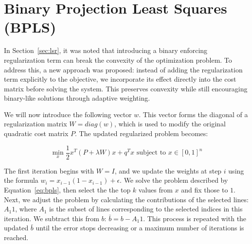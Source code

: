 \section{Binary Projection Least Squares (BPLS)}

In Section~\ref{sec:lsr}, it was noted that introducing a binary enforcing regularization term can break the convexity of the optimization problem. To address this, a new approach was proposed: instead of adding the regularization term explicitly to the objective, we incorporate its effect directly into the cost matrix before solving the system. This preserves convexity while still encouraging binary-like solutions through adaptive weighting.

We will now introduce the following vector \(w\). This vector forms the diagonal of a regularization matrix \(W = diag(w)\), which is used to modify the original quadratic cost matrix \(P\). The updated regularized problem becomes:

\begin{equation}
\label{eq:bpls}
\min_{x} \frac{1}{2} x^T(P + \lambda W)x + q^Tx \text{ subject to } x \in [0,1]^n
\end{equation}

The first iteration begins with \(W = I\), and we update the weights at step \(i\) using the formula \(w_i = x_{i-1}(1-x_{i-1}) + \epsilon\). We solve the problem described by Equation~\ref{eq:bpls}, then select the the top \(k\) values from \(x\) and fix those to \(1\). Next, we adjust the problem by calculating the contributions of the selected lines: \(A_1 1\), where \(A_1\) is the subset of lines corresponding to the selected indices in this iteration. We subtract this from \(b\): \(\bar{b} = b - A_1 1\). This process is repeated with the updated \(\bar{b}\) until the error stops decreasing or a maximum number of iterations is reached.

